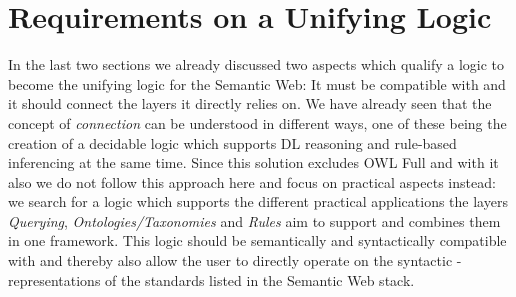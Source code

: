 \section{Requirements on a Unifying Logic}
In the last two sections we already discussed two aspects which qualify a logic to become the unifying logic for the Semantic Web: It must be compatible with \rdf and it should 
 connect the layers it directly relies on. We have already seen that the concept of \emph{connection} can be understood in different ways, one of these being the creation of a 
 decidable logic which supports DL reasoning and rule-based inferencing at the same time. Since this solution excludes OWL Full and with it also \rdf we do not follow this approach here 
 and focus on practical aspects instead: we search for a logic which supports the different practical applications the layers \emph{Querying}, \emph{Ontologies/Taxonomies} and 
 \emph{Rules} aim to support and combines them in one framework. This logic should be semantically and syntactically compatible with \rdf and
 thereby also allow the user to directly operate 
 on the syntactic \rdf-representations 
 of the standards listed in the Semantic Web stack. 
 
